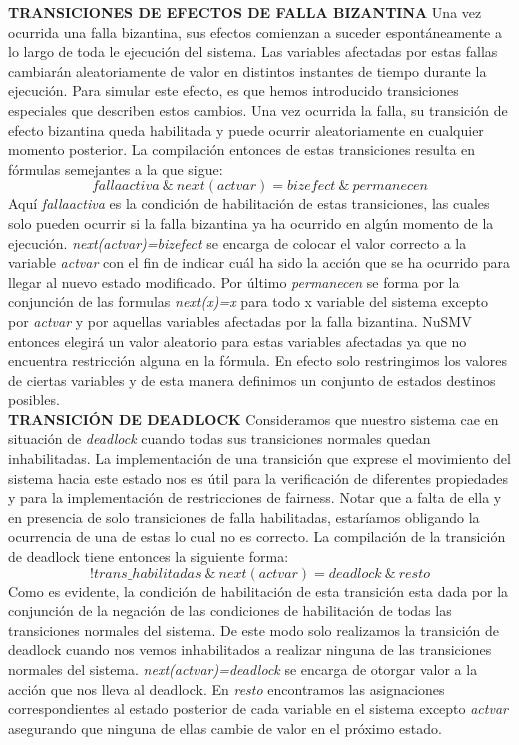 \documentclass[titlepage, 12pt]{book}
\begin{document}
\textbf{TRANSICIONES DE EFECTOS DE FALLA BIZANTINA}
Una vez ocurrida una falla bizantina, sus efectos comienzan a suceder espontáneamente a lo largo de toda le ejecución del sistema. Las variables afectadas por estas fallas cambiarán aleatoriamente de valor en distintos instantes de tiempo durante la ejecución. Para simular este efecto, es que hemos introducido transiciones especiales que describen estos cambios. Una vez ocurrida la falla, su transición de efecto bizantina queda habilitada y puede ocurrir aleatoriamente en cualquier momento posterior. La compilación entonces de estas transiciones resulta en fórmulas semejantes a la que sigue:
$$fallaactiva~\&~next(actvar)=bizefect~\&~permanecen$$
Aquí \textit{fallaactiva} es la condición de habilitación de estas transiciones, las cuales solo pueden ocurrir si la falla bizantina ya ha ocurrido en algún momento de la ejecución. \textit{next(actvar)=bizefect} se encarga de colocar el valor correcto a la variable \textit{actvar} con el fin de indicar cuál ha sido la acción que se ha ocurrido para llegar al nuevo estado modificado. Por último \textit{permanecen} se forma por la conjunción de las formulas \textit{next(x)=x} para todo x variable del sistema excepto por \textit{actvar} y por aquellas variables afectadas por la falla bizantina. NuSMV entonces elegirá un valor aleatorio para estas variables afectadas ya que no encuentra restricción alguna en la fórmula. En efecto solo restringimos los valores de ciertas variables y de esta manera definimos un conjunto de estados destinos posibles.\\

\textbf{TRANSICIÓN DE DEADLOCK}
Consideramos que nuestro sistema cae en situación de \textit{deadlock} cuando todas sus transiciones normales quedan inhabilitadas. La implementación de una transición que exprese el movimiento del sistema hacia este estado nos es útil para la verificación de diferentes propiedades y para la implementación de restricciones de fairness. Notar que a falta de ella y en presencia de solo transiciones de falla habilitadas, estaríamos obligando la ocurrencia de una de estas lo cual no es correcto. La compilación de la transición de deadlock tiene entonces la siguiente forma:
$$!trans\_habilitadas~\&~next(actvar)=deadlock~\&~resto$$
Como es evidente, la condición de habilitación de esta transición esta dada por la conjunción de la negación de las condiciones de habilitación de todas las transiciones normales del sistema. De este modo solo realizamos la transición de deadlock cuando nos vemos inhabilitados a realizar ninguna de las transiciones normales del sistema. \textit{next(actvar)=deadlock} se encarga de otorgar valor a la acción que nos lleva al deadlock. En \textit{resto} encontramos las asignaciones correspondientes al estado posterior de cada variable en el sistema excepto \textit{actvar} asegurando que ninguna de ellas cambie de valor en el próximo estado.
\end{document}
